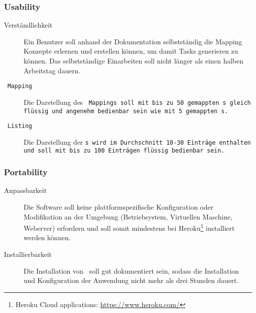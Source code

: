 		\subsubsection{Usability}
		\begin{description}
			\item[Verständlichkeit] Ein Benutzer soll anhand der Dokumentation selbstständig die Mapping Konzepte erlernen und erstellen können, um damit Tasks generieren zu können. Das selbstständige Einarbeiten soll nicht länger als einen halben Arbeitstag dauern.
			\item[\tt\ Mapping] Die Darstellung des \tt\ Mappings soll mit bis zu 50 gemappten \tt s gleich flüssig und angenehm bedienbar sein wie mit 5 gemappten \tt s.
			\item[\tt\ Listing] Die Darstellung der \tt s wird im Durchschnitt 10-30 Einträge enthalten und soll mit bis zu 100 Einträgen flüssig bedienbar sein.
		\end{description}

		
		\subsubsection{Portability}
		\begin{description}
			\item[Anpassbarkeit] Die Software soll keine plattformspezifische Konfiguration oder Modifikation an der Umgebung (Betriebsystem, Virtuellen Maschine, Weberver) erfordern und soll somit mindestens bei Heroku\footnote{Heroku Cloud applications: \url{https://www.heroku.com/}} installiert werden können.
			\item[Installierbarkeit] Die Installation von \eeppi\ soll gut dokumentiert sein, sodass die Installation und Konfiguration der Anwendung nicht mehr als drei Stunden dauert.
		\end{description}
